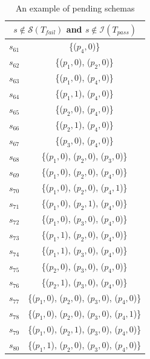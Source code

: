 \begin{table}[htbp]
  \centering
  \caption{An example of pending schemas}
  \label{ex:pendingschemas}
    \begin{tabular}{|c|c|} \hline
     \multicolumn{2}{|c|}{\textbf{$s \not\in \mathcal{S}(T_{fail})$ and $s \not\in \mathcal{I}(T_{pass})$}} \\ \hline
  $s_{61}$ & \{($p_{4}, 0$)\}\\

  $s_{62}$ & \{($p_{1}, 0$), ($p_{2}, 0$)\}\\

  $s_{63}$ & \{($p_{1}, 0$), ($p_{4}, 0$)\}\\
  $s_{64}$ & \{($p_{1}, 1$), ($p_{4}, 0$)\}\\
  $s_{65}$ & \{($p_{2}, 0$), ($p_{4}, 0$)\}\\
  $s_{66}$ & \{($p_{2}, 1$), ($p_{4}, 0$)\}\\
  $s_{67}$ & \{($p_{3}, 0$), ($p_{4}, 0$)\}\\

  $s_{68}$ & \{($p_{1}, 0$), ($p_{2}, 0$), ($p_{3}, 0$)\}\\

  $s_{69}$ & \{($p_{1}, 0$), ($p_{2}, 0$), ($p_{4}, 0$)\}\\
  $s_{70}$ & \{($p_{1}, 0$), ($p_{2}, 0$), ($p_{4}, 1$)\}\\


  $s_{71}$ & \{($p_{1}, 0$), ($p_{2}, 1$), ($p_{4}, 0$)\}\\
  $s_{72}$ & \{($p_{1}, 0$), ($p_{3}, 0$), ($p_{4}, 0$)\}\\

  $s_{73}$ & \{($p_{1}, 1$), ($p_{2}, 0$), ($p_{4}, 0$)\}\\
  $s_{74}$ & \{($p_{1}, 1$), ($p_{3}, 0$), ($p_{4}, 0$)\}\\

  $s_{75}$ & \{($p_{2}, 0$), ($p_{3}, 0$), ($p_{4}, 0$)\}\\
  $s_{76}$ & \{($p_{2}, 1$), ($p_{3}, 0$), ($p_{4}, 0$)\}\\


  $s_{77}$ & \{($p_{1}, 0$), ($p_{2}, 0$), ($p_{3}, 0$), ($p_{4}, 0$)\} \\
  $s_{78}$ & \{($p_{1}, 0$), ($p_{2}, 0$), ($p_{3}, 0$), ($p_{4}, 1$)\} \\
  $s_{79}$ & \{($p_{1}, 0$), ($p_{2}, 1$), ($p_{3}, 0$), ($p_{4}, 0$)\} \\
  $s_{80}$ & \{($p_{1}, 1$), ($p_{2}, 0$), ($p_{3}, 0$), ($p_{4}, 0$)\} \\ \hline

    \end{tabular}%
\end{table}



